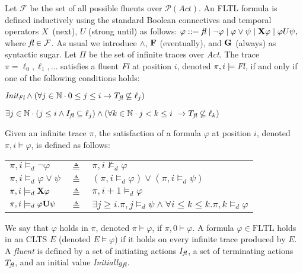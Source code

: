 \documentclass{article}
\begin{document}
Let $\mathcal{F}$ be the set of all possible fluents over $\mathcal{P}(Act)$. 
An FLTL formula is defined inductively using the standard Boolean connectives and temporal operators $X$~(next), $U$ (strong until) as follows: 
$\varphi ::= \emph{fl} \mid \neg \varphi \mid \varphi \vee \psi \mid {\bf X} \varphi \mid \varphi U \psi,$
where $\emph{fl}\in\mathcal{F}$. 
As usual we introduce $\wedge$, ${\bf F}$ (eventually), and ${\bf G}$ (always) as syntactic sugar. 
Let $\Pi$ be the set of infinite traces over \emph{Act}.
The trace $\pi=\ell_0,\ell_1,\ldots$ satisfies a fluent $\emph{Fl}$ at position $i$, denoted $\pi,i \models \emph{Fl}$, if and only if one of the following conditions holds:
\begin{list}{-}%
	\item $\emph{Init}_{\emph{Fl}} \wedge (\forall j \in \mathbb{N} \cdot 0 \leq j \leq i \rightarrow T_{\emph{fl}} \not\subseteq \ell_j)$
	\item $\exists j \in \mathbb{N} \cdot (j \leq i \wedge I_{\emph{fl}} \subseteq \ell_j) \wedge (\forall k \in \mathbb{N} \cdot j < k \leq i \ \rightarrow T_{\emph{fl}} \not\subseteq \ell_k)$
\end{list}

Given an infinite trace $\pi$, the satisfaction of a formula $\varphi$ at position $i$, denoted $\pi,i\models\varphi$, is defined as follows:

\begin{tabular}{ l c l }
$\pi, i \models_d \neg \varphi$ & $\triangleq$ & $\pi, i \not\models_d \varphi$\\
$\pi, i \models_d \varphi \vee \psi$ & $\triangleq$ & $(\pi, i \models_d \varphi) \vee (\pi, i \models_d \psi)$\\
$\pi, i \models_d {\bf X} \varphi$ & $\triangleq$ & $\pi, i +1 \models_d \varphi$\\
$\pi, i \models_d \varphi {\bf U} \psi$ & $\triangleq$ & $\exists j \geq i . \pi,j \models_d \psi \wedge \forall i \leq k \le k. \pi, k \models_d \varphi$\\
\end{tabular}
  
We say that $\varphi$ holds in $\pi$, denoted $\pi\models\varphi$, if $\pi,0\models\varphi$. 
A formula $\varphi \in \mbox{FLTL}$ holds in an CLTS $E$ (denoted $E \models \varphi$) if it holds on every infinite trace produced by $E$.
A \emph{fluent} \fluent \space is defined by a set of initiating actions $I_{\emph{fl}}$, a set of terminating actions $T_{\emph{fl}}$, and an initial value \emph{Initially}$_{\emph{fl}}$.
\end{document}

